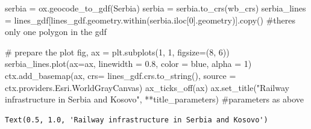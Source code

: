 \documentclass[
  letterpaper,
  DIV=11,
  numbers=noendperiod]{scrreprt}
\newenvironment{Shaded}{\begin{snugshade}}{\end{snugshade}}
\newcommand{\CommentTok}[1]{\textcolor[rgb]{0.37,0.37,0.37}{#1}}
\newcommand{\DecValTok}[1]{\textcolor[rgb]{0.68,0.00,0.00}{#1}}
\newcommand{\FloatTok}[1]{\textcolor[rgb]{0.68,0.00,0.00}{#1}}
\newcommand{\NormalTok}[1]{\textcolor[rgb]{0.00,0.23,0.31}{#1}}
\newcommand{\OperatorTok}[1]{\textcolor[rgb]{0.37,0.37,0.37}{#1}}
\newcommand{\StringTok}[1]{\textcolor[rgb]{0.13,0.47,0.30}{#1}}
\begin{document}
\begin{Shaded}
\begin{Highlighting}[]
\NormalTok{serbia }\OperatorTok{=}\NormalTok{ ox.geocode\_to\_gdf(}\StringTok{\textquotesingle{}Serbia\textquotesingle{}}\NormalTok{)}
\NormalTok{serbia }\OperatorTok{=}\NormalTok{ serbia.to\_crs(wb\_crs)}
\NormalTok{serbia\_lines }\OperatorTok{=}\NormalTok{ lines\_gdf[lines\_gdf.geometry.within(serbia.iloc[}\DecValTok{0}\NormalTok{].geometry)].copy() }\CommentTok{\#there\textquotesingle{}s only one polygon in the gdf}
\end{Highlighting}
\end{Shaded}

\begin{Shaded}
\begin{Highlighting}[]
\CommentTok{\# prepare the plot}
\NormalTok{fig, ax }\OperatorTok{=}\NormalTok{ plt.subplots(}\DecValTok{1}\NormalTok{, }\DecValTok{1}\NormalTok{, figsize}\OperatorTok{=}\NormalTok{(}\DecValTok{8}\NormalTok{, }\DecValTok{6}\NormalTok{))}
\NormalTok{serbia\_lines.plot(ax}\OperatorTok{=}\NormalTok{ax, linewidth }\OperatorTok{=} \FloatTok{0.8}\NormalTok{, color }\OperatorTok{=} \StringTok{\textquotesingle{}blue\textquotesingle{}}\NormalTok{, alpha }\OperatorTok{=} \DecValTok{1}\NormalTok{)}
\NormalTok{ctx.add\_basemap(ax, crs}\OperatorTok{=}\NormalTok{ lines\_gdf.crs.to\_string(), source }\OperatorTok{=}\NormalTok{ ctx.providers.Esri.WorldGrayCanvas)}
\NormalTok{ax\_ticks\_off(ax)}
\NormalTok{ax.set\_title(}\StringTok{"Railway infrastructure in Serbia and Kosovo"}\NormalTok{, }\OperatorTok{**}\NormalTok{title\_parameters) }\CommentTok{\#parameters as above}
\end{Highlighting}
\end{Shaded}

\begin{verbatim}
Text(0.5, 1.0, 'Railway infrastructure in Serbia and Kosovo')
\end{verbatim}
\end{document}

